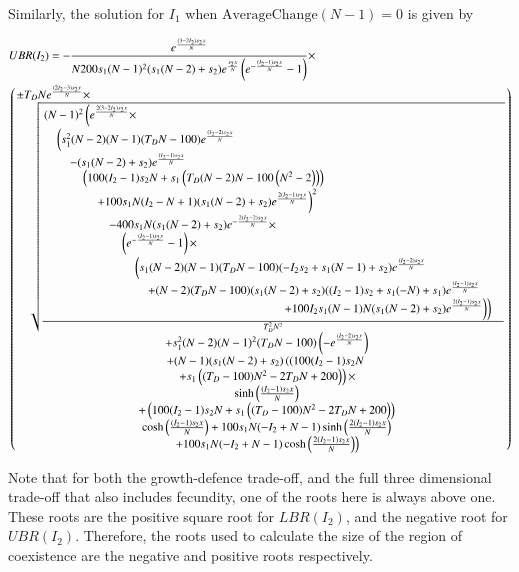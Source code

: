  Similarly, the solution for $I_1$ when $\text{AverageChange}(N-1)=0$ is given by
 \begin{small}
 \begin{align}
 \label{ubr}
&UBR(I_2)=-\frac{e^{\frac{(3-2 I_2) s_2 x}{N}}}{N 200 s_1 (N-1)^2 (s_1 (N-2)+s_2)
   e^{\frac{s_2 x}{N}} \left(e^{-\frac{(I_2-1) s_2
   x}{N}}-1\right)}\times \\
& \begin{pmatrix}\splitfrac{\pm T_D N
   e^{\frac{(2 I_2-3) s_2 x}{N}} \times}{
   \begin{matrix}  \sqrt{ \frac{  \splitfrac{(N-1)^2
   \left(e^{\frac{2 (3-2 I_2) s_2 x}{N}} \times \right.}{\splitfrac{\left(s_1^2
   (N-2) (N-1) (T_D N-100)
   e^{\frac{(I_2-2) s_2 x}{N}}\right.}{\splitfrac{-(s_1
   (N-2)+s_2) e^{\frac{(I_2-1) s_2 x}{N}}}{\splitfrac{
   \left(100 (I_2-1) s_2 N+s_1 \left(T_D
   (N-2) N-100 \left(N^2-2\right)\right)\right)}{\splitfrac{\left. +100
   s_1 N (I_2-N+1) (s_1
   (N-2)+s_2) e^{\frac{2 (I_2-1) s_2
   x}{N}}\right)^2}{\splitfrac{-400 s_1 N (s_1
   (N-2)+s_2) e^{-\frac{2 (I_2-2) s_2 x}{N}} \times }
{\splitfrac{ \left(e^{-\frac{(I_2-1) s_2 x}{N}}-1\right)\times}{\splitfrac{ \left(s_1
   (N-2) (N-1) (T_D N-100) (-I_2
   s_2+s_1 (N-1)+s_2) e^{\frac{(I_2-2) s_2
   x}{N}}\right.}{\splitfrac{+(N-2) (T_D N-100) (s_1
   (N-2)+s_2) ((I_2-1) s_2+s_1
   (-N)+s_1) e^{\frac{(I_2-1) s_2 x}{N}}}{\left. \left.+100
   I_2 s_1 (N-1) N (s_1
   (N-2)+s_2) e^{\frac{2 (I_2-1) s_2
   x}{N}}\right)\right)}}}}}}}}}}
   {T_D^2 N^2}} \\
         +s_1^2   (N-2) (N-1)^2 (T_D N-100)   \left(-e^{\frac{(I_2-2) s_2 x}{N}}\right) \\
   +(N-1)   (s_1 (N-2)+s_2) \left(\left(100 (I_2-1) s_2   N\right. \right. \\
   \left.+s_1 \left((T_D-100) N^2-2 T_D   N+200\right)\right) \times \\
    \sinh \left(\frac{(I_2-1) s_2   x}{N}\right)\\
   +\left(100 (I_2-1) s_2 N+s_1   \left((T_D-100) N^2-2 T_D N+200\right)\right) \\
   \cosh \left(\frac{(I_2-1) s_2 x}{N}\right)+100 s_1   N (-I_2+N-1) \sinh \left(\frac{2 (I_2-1) s_2   x}{N}\right) \\
  \left.+100 s_1 N (-I_2+N-1) \cosh   \left(\frac{2 (I_2-1) s_2  x}{N}\right)\right)
   \end{matrix}} \end{pmatrix} \notag
  \end{align}

  \end{small}
 Note that for both the growth-defence trade-off, and the full three dimensional trade-off that also includes fecundity, one of the roots here is always above one. These roots are the positive square root for $LBR(I_2)$, and the negative root for $UBR(I_2)$. Therefore, the roots used to calculate the size of the region of coexistence are the negative and positive roots respectively.

